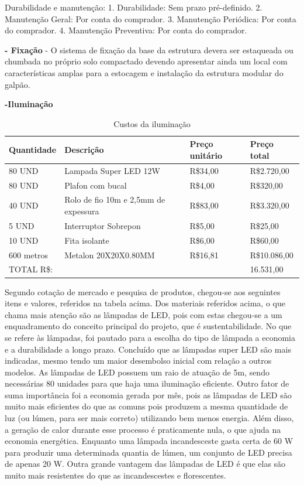 Durabilidade e manutenção:
1. Durabilidade: Sem prazo pré-definido.
2. Manutenção Geral: Por conta do comprador.
3. Manutenção Periódica: Por conta do comprador.
4. Manutenção Preventiva: Por conta do comprador.

\textbf{- Fixação} - O sistema de fixação da base da estrutura devera ser estaqueada ou chumbada no próprio solo compactado devendo apresentar ainda um local com características amplas para a estocagem e instalação da estrutura modular do galpão.

\textbf{-Iluminação}

\begin{table}[h]
\centering
\caption{Custos da iluminação}
\label{CustosIluminacao}
\begin{tabular}{|l|l|l|l|}
\hline
Quantidade & Descrição                            & Preço unitário & Preço total  \\ \hline
80 UND     & Lampada Super LED 12W                & R\$34,00       & R\$2.720,00  \\ \hline
80 UND     & Plafon com bucal                     & R\$4,00        & R\$320,00    \\ \hline
40 UND     & Rolo de fio 10m e 2,5mm de expessura & R\$83,00       & R\$3.320,00  \\ \hline
5 UND      & Interruptor Sobrepon                 & R\$5,00        & R\$25,00     \\ \hline
10 UND     & Fita isolante                        & R\$6,00        & R\$60,00     \\ \hline
600 metros & Metalon 20X20X0.80MM                 & R\$16,81       & R\$10.086,00 \\ \hline
TOTAL R\$: &                                      &                & 16.531,00    \\ \hline
\end{tabular}
\end{table}

	Segundo cotação de mercado e pesquisa de produtos, chegou-se aos seguintes itens e valores, referidos na tabela acima. Dos materiais referidos acima, o que chama mais atenção são as lâmpadas de LED, pois com estas chegou-se a um enquadramento do conceito principal do projeto, que é sustentabilidade. No que se refere às lâmpadas, foi pautado para a escolha do tipo de lâmpada a economia e a durabilidade a longo prazo. Concluído que as lâmpadas super LED são mais indicadas, mesmo tendo um maior desembolso inicial com relação a outros modelos. As lâmpadas de LED possuem um raio de atuação de 5m, sendo necessárias 80 unidades para que haja uma iluminação eficiente. Outro fator de suma importância foi a economia gerada por mês, pois as lâmpadas de LED são muito mais eficientes do que as comuns pois produzem a mesma quantidade de luz (ou lúmen, para ser mais correto) utilizando bem menos energia. Além disso, a geração de calor durante esse processo é praticamente nula, o que ajuda na economia energética. Enquanto uma lâmpada incandesceste gasta certa de 60 W para produzir uma determinada quantia de lúmen, um conjunto de LED precisa de apenas 20 W. Outra grande vantagem das lâmpadas de LED é que elas são muito mais resistentes do que as incandescestes e florescentes.
	
